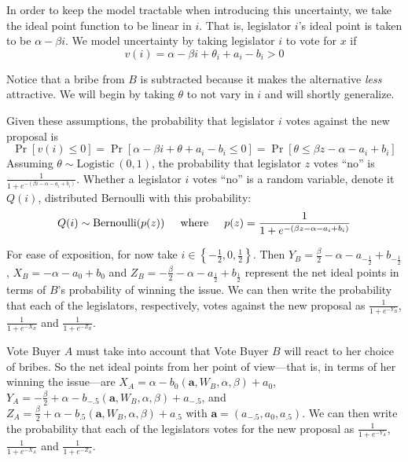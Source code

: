 \documentclass[12pt]{article}
\newcommand{\ve}{\theta}
\newcommand{\al}{\alpha}
\begin{document}
In order to keep the model tractable when introducing this uncertainty, we take the ideal point function to be linear in $i$. That is, legislator $i$'s ideal point is taken to be $\alpha -\beta i$. We model uncertainty by taking legislator $i$ to vote for $x$ if 
			  \[
				  v(i) = \alpha -\beta i + \ve_i + a_i - b_i > 0
				\]
		
Notice that a bribe from $B$ is subtracted because it makes the alternative \textit{less} attractive.	We will begin by taking $\ve$ to not vary in $i$ and will shortly generalize.

Given these assumptions, the probability that legislator $i$ votes against the new proposal is
	\[
					\Pr\left[v(i)\leq 0 \right] = \Pr\left[\alpha -\beta i + \ve + a_i - b_i \leq 0 \right] = \Pr\left[\ve \leq \beta z - \alpha - a_i + b_i \right] 
	\]
Assuming $\ve \sim \text{Logistic} \ (0,1)$, the probability that legislator $z$ votes ``no'' is $\frac{1}{1+e^{-\left(\beta i - \alpha - a_i + b_i \right)}}$.	Whether a legislator $i$ votes ``no'' is a random variable, denote it $Q(i)$, distributed Bernoulli with this probability:
	\[
		Q(i) \sim \text{Bernoulli}(p(z)) \hskip.2in \text{where} \hskip.2in p(z) = \frac{1}{1+e^{-\left(\beta z - \alpha -a_i+ b_i \right)}}
	\]

For ease of exposition, for now take $i \in \left\{ -\frac{1}{2}, 0, \frac{1}{2} \right\}$. Then $Y_B = \frac{\beta}{2} - \alpha - a_{-\frac{1}{2}} + b_{-\frac{1}{2}}$, $X_B = -\alpha - a_0+ b_0$ and $Z_B = -\frac{\beta}{2} - \alpha - a_{\frac{1}{2}} + b_{\frac{1}{2}}\label{page:sh}$ represent the net ideal points in terms of $B$'s probability of winning the issue. We can then write the probability that each of the legislators, respectively, votes against the new proposal as $\frac{1}{1+e^{-Y_B}}$, $\frac{1}{1+e^{-X_B}}$ and $\frac{1}{1+e^{-Z_B}}$.

Vote Buyer $A$ must take into account that Vote Buyer $B$ will react to her choice of bribes. So the net ideal points from her point of view---that is, in terms of her winning the issue---are $X_A = \alpha - b_0(\bm{a},W_B,\al,\beta) + a_0$, $Y_A = -\frac{\beta}{2} + \alpha - b_{-.5}\left(\bm{a},W_B,\al,\beta\right)+ a_{-.5}$, and $Z_A = \frac{\beta}{2} + \alpha - b_{.5}\left(\bm{a},W_B,\al,\beta\right)+ a_{.5}$ with $\bm a = \left(a_{-.5},a_0,a_{.5} \right)$. We can then write the probability that each of the legislators votes for the new proposal as $\frac{1}{1+e^{-Y_A}}$, $\frac{1}{1+e^{-X_A}}$ and $\frac{1}{1+e^{-Z_A}}$.
				
\end{document}

